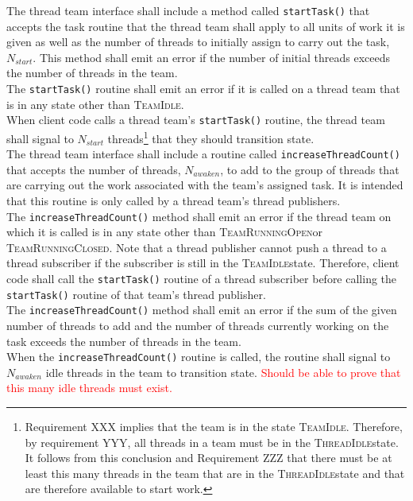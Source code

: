 \documentclass{article}
\newcommand{\TeamIdle}          {\textsc{TeamIdle}}
\newcommand{\TeamRunningOpen}   {\textsc{TeamRunningOpen}}
\newcommand{\TeamRunningClosed} {\textsc{TeamRunningClosed}}
\newcommand{\ThreadIdle}        {\textsc{ThreadIdle}}
\begin{document}
The thread team interface shall include a method called \texttt{startTask()}
that accepts the task routine that the thread team shall apply to all units of
work it is given as well as the number of threads to initially assign to carry
out the task, $N_{start}$.  This method shall emit an error if the number of
initial threads exceeds the number of threads in the team.\\

The \texttt{startTask()} routine shall emit an error if it is called on a thread
team that is in any state other than \TeamIdle.\\

When client code calls a thread team's \texttt{startTask()} routine, the thread
team shall signal to $N_{start}$ threads\footnote{Requirement XXX implies that
the team is in the state \TeamIdle.  Therefore, by requirement YYY, all threads
in a team must be in the \ThreadIdle state.  It follows from this conclusion and
Requirement ZZZ that there must be at least this many threads in the team that
are in the \ThreadIdle state and that are therefore available to start work.}
that they should transition state.\\

The thread team interface shall include a routine called
\texttt{increaseThreadCount()} that accepts the number of threads, $N_{awaken}$,
to add to the group of threads that are carrying out the work associated with
the team's assigned task.  It is intended that this routine is only called by a
thread team's thread publishers.\\

The \texttt{increaseThreadCount()} method shall emit an error if the thread team
on which it is called is in any state other than \TeamRunningOpen or
\TeamRunningClosed.  Note that a thread publisher cannot push a thread to a
thread subscriber if the subscriber is still in the \TeamIdle state.  Therefore,
client code shall call the \texttt{startTask()} routine of a thread subscriber
before calling the \texttt{startTask()} routine of that team's thread publisher.\\

The \texttt{increaseThreadCount()} method shall emit an error if the sum of the
given number of threads to add and the number of threads currently working on
the task exceeds the number of threads in the team.\\

When the \texttt{increaseThreadCount()} routine is called, the routine shall
signal to $N_{awaken}$ idle threads in the team to transition state.
\textcolor{red}{Should be able to prove that this many idle threads must
exist.}\\
\end{document}

